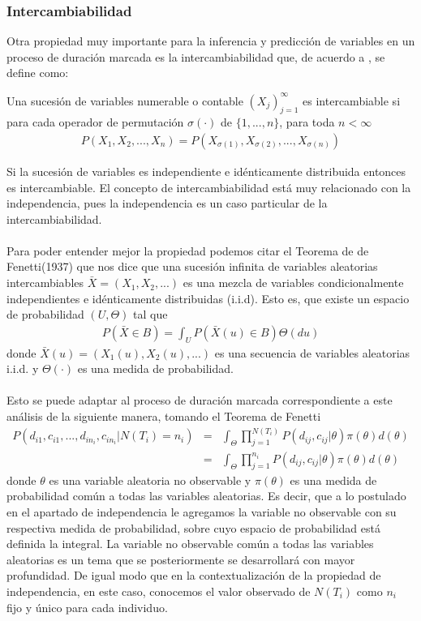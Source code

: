 \subsubsection{Intercambiabilidad}
Otra propiedad muy importante para la inferencia y predicci\'on de variables en un proceso de duraci\'on marcada es la intercambiabilidad que, de acuerdo a \cite{hahn2012exchangeable}, se define como:
\begin{defi}
Una sucesi\'on de variables numerable o contable $(X_j)_{j=1}^{\infty}$ es intercambiable si para cada operador de permutaci\'on $\sigma(\cdot)$ de $\{1,...,n\}$, para toda $n<\infty$ 
\begin{align}
P(X_1,X_2,...,X_n)=P(X_{\sigma(1)},X_{\sigma(2)},...,X_{\sigma(n)}) \nonumber
\end{align}
\end{defi}
Si la sucesi\'on de variables es independiente e id\'enticamente distribuida entonces es intercambiable. El concepto de intercambiabilidad est\'a muy relacionado con la independencia, pues la independencia es un caso particular de la intercambiabilidad.\\
\\
Para poder entender mejor la propiedad podemos citar el Teorema de de Fenetti(1937) que nos dice que una sucesi\'on infinita de variables aleatorias intercambiables $\bar{X}=(X_1,X_2,...)$ es una mezcla de variables condicionalmente independientes e id\'enticamente distribuidas (i.i.d). Esto es, que existe un espacio de probabilidad $(U,\Theta)$ tal que
\begin{align*}
P(\bar{X} \in B)=\int_U P(\bar{X}(u) \in B) \Theta(du)
\end{align*}
donde $\bar{X}(u)=(X_1(u),X_2(u),...)$ es una secuencia de variables aleatorias i.i.d. y $\Theta(\cdot)$ es una medida de probabilidad.\\
\\
Esto se puede adaptar al proceso de duraci\'on marcada correspondiente a este an\'alisis de la siguiente manera, tomando el Teorema de Fenetti
\begin{eqnarray*}
P(d_{i1},c_{i1},...,d_{in_i},c_{in_i}|N(T_i)=n_i)&=&\int_\Theta \prod_{j=1}^{N(T_i)} P(d_{ij},c_{ij}|\theta) \pi(\theta) d(\theta)\\
&=& \int_\Theta \prod_{j=1}^{n_i} P(d_{ij},c_{ij}|\theta) \pi(\theta) d(\theta)
\end{eqnarray*}
donde $\theta$ es una variable aleatoria no observable y $\pi(\theta)$ es una medida de probabilidad com\'un a todas las variables aleatorias. Es decir, que a lo postulado en el apartado de independencia le agregamos la variable no observable con su respectiva medida de probabilidad, sobre cuyo espacio de probabilidad est\'a definida la integral. La variable no observable com\'un a todas las variables aleatorias es un tema que se posteriormente se desarrollar\'a con mayor profundidad. De igual modo que en la contextualizaci\'on de la propiedad de independencia, en este caso, conocemos el valor observado de $N(T_i)$ como $n_i$ fijo y \'unico para cada individuo.
